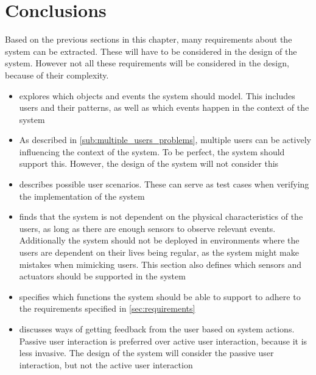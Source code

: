 \section{Conclusions}

Based on the previous sections in this chapter, many requirements about the system can be extracted. These will have to be considered in the design of the system. However not all these requirements will be considered in the design, because of their complexity. 

\begin{itemize}
\item {} explores which objects and events the system should model. This includes users and their patterns, as well as which events happen in the context of the system
\item As described in \cref{sub:multiple_users_problems}, multiple users can be actively influencing the context of the system. To be perfect, the system should support this. However, the design of the system will not consider this
\item {} describes possible user scenarios. These can serve as test cases when verifying the implementation of the system
\item {} finds that the system is not dependent on the physical characteristics of the users, as long as there are enough sensors to observe relevant events. Additionally the system should not be deployed in environments where the users are dependent on their lives being regular, as the system might make mistakes when mimicking users. This section also defines which sensors and actuators should be supported in the system
\item {} specifies which functions the system should be able to support to adhere to the requirements specified in \cref{sec:requirements}
\item {} discusses ways of getting feedback from the user based on system actions. Passive user interaction is preferred over active user interaction, because it is less invasive. The design of the system will consider the passive user interaction, but not the active user interaction
\end{itemize}